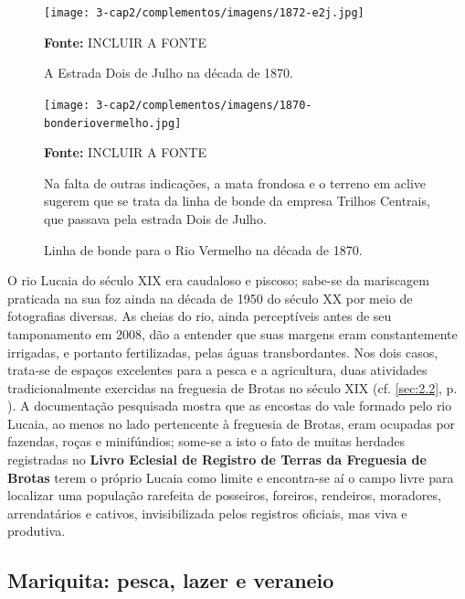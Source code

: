 \begin{figure}
\caption{A Estrada Dois de Julho na década de 1870.}
\centering
\texttt{[image: 3-cap2/complementos/imagens/1872-e2j.jpg]}{\footnotesize \par \textbf{Fonte:} INCLUIR A FONTE } 
\label{fig:1872-e2j}
\end{figure}

\begin{figure}
\caption{Linha de bonde para o Rio Vermelho na década de 1870.}
\centering
\texttt{[image: 3-cap2/complementos/imagens/1870-bonderiovermelho.jpg]}{\footnotesize \par \textbf{Fonte:} INCLUIR A FONTE \par Na falta de outras indicações, a mata frondosa e o terreno em aclive sugerem que se trata da linha de bonde da empresa Trilhos Centrais, que passava pela estrada Dois de Julho.} 
\label{fig:1870-bonderiovermelho}
\end{figure}

O rio Lucaia do século XIX era caudaloso e piscoso; sabe-se da mariscagem praticada na sua foz ainda na década de 1950 do século XX por meio de fotografias diversas. As cheias do rio, ainda perceptíveis antes de seu tamponamento em 2008, dão a entender que suas margens eram constantemente irrigadas, e portanto fertilizadas, pelas águas transbordantes. Nos dois casos, trata-se de espaços excelentes para a pesca e a agricultura, duas atividades tradicionalmente exercidas na freguesia de Brotas no século XIX (cf. \autoref{sec:2.2}, p. \pageref{sec:2.2}). A documentação pesquisada mostra que as encostas do vale formado pelo rio Lucaia, ao menos no lado pertencente à freguesia de Brotas, eram ocupadas por fazendas, roças e minifúndios; some-se a isto o fato de muitas herdades registradas no \textbf{Livro Eclesial de Registro de Terras da Freguesia de Brotas} terem o próprio Lucaia como limite e encontra-se aí o campo livre para localizar uma população rarefeita de posseiros, foreiros, rendeiros, moradores, arrendatários e cativos, invisibilizada pelos registros oficiais, mas viva e produtiva.

\subsection{Mariquita: pesca, lazer e veraneio}\label{subsec:mariq}

